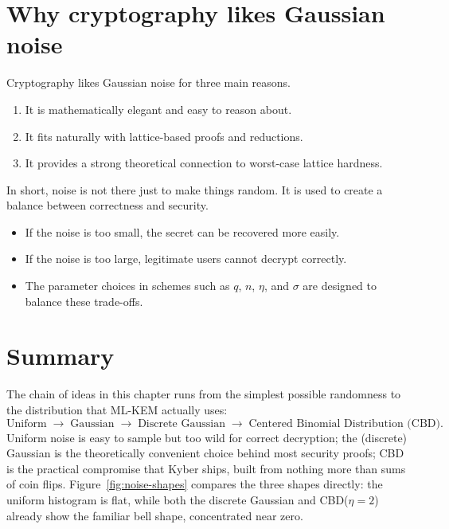 \section{Why cryptography likes Gaussian noise}

Cryptography likes Gaussian noise for three main reasons.

\begin{enumerate}
    \item It is mathematically elegant and easy to reason about.
    \item It fits naturally with lattice-based proofs and reductions.
    \item It provides a strong theoretical connection to worst-case lattice hardness.
\end{enumerate}

In short, noise is not there just to make things random. It is used to create a balance between correctness and security.

\begin{itemize}
    \item If the noise is too small, the secret can be recovered more easily.
    \item If the noise is too large, legitimate users cannot decrypt correctly.
    \item The parameter choices in schemes such as $q$, $n$, $\eta$, and $\sigma$ are designed to balance these trade-offs.
\end{itemize}

\section{Summary}

The chain of ideas in this chapter runs from the simplest possible randomness to the distribution that ML-KEM actually uses:
\[
\text{Uniform} \;\longrightarrow\; \text{Gaussian} \;\longrightarrow\; \text{Discrete Gaussian} \;\longrightarrow\; \text{Centered Binomial Distribution (CBD)}.
\]
Uniform noise is easy to sample but too wild for correct decryption; the (discrete) Gaussian is the theoretically convenient choice behind most security proofs; CBD is the practical compromise that Kyber ships, built from nothing more than sums of coin flips. Figure~\ref{fig:noise-shapes} compares the three shapes directly: the uniform histogram is flat, while both the discrete Gaussian and CBD($\eta=2$) already show the familiar bell shape, concentrated near zero.

